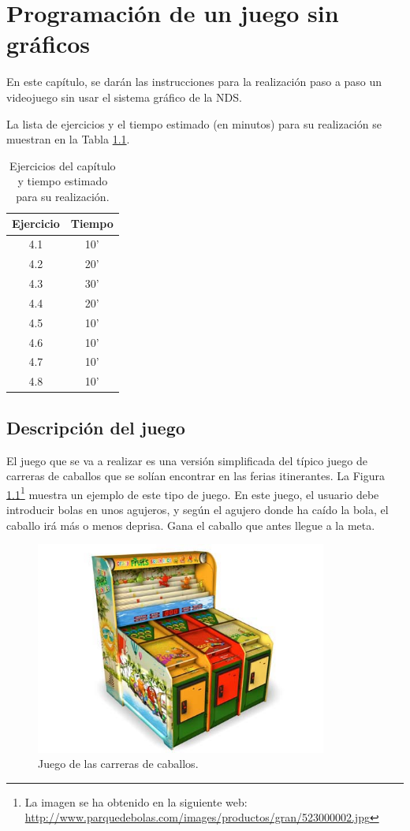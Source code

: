 \chapter{Programación de un juego sin gráficos}

En este capítulo, se darán las instrucciones para la realización paso a paso un videojuego sin usar el sistema gráfico de la NDS.

La lista de ejercicios y el tiempo estimado (en minutos) para su realización se muestran en la Tabla \ref{c4_tab:ejercios}.

\begin{table}[t]
\centering
\caption{Ejercicios del capítulo y tiempo estimado para su realización.}
\begin{tabular}{|c|c|}
\hline 
Ejercicio & Tiempo \\ 
\hline 
 4.1 & 10' \\ 
 4.2 & 20' \\ 
 4.3 & 30' \\ 
 4.4 & 20' \\ 
 4.5 & 10' \\ 
 4.6 & 10' \\ 
 4.7 & 10' \\ 
 4.8 & 10' \\ 
\hline 
\end{tabular} 
\label{c4_tab:ejercios}
\end{table}

\section{Descripción del juego}
El juego que se va a realizar es una versión simplificada del típico juego de carreras de caballos que se solían encontrar en las ferias itinerantes. La Figura \ref{fig_c4_caballos}\footnote{La imagen se ha obtenido en la siguiente web: \url{http://www.parquedebolas.com/images/productos/gran/523000002.jpg}} muestra un ejemplo de este tipo de juego. En este juego, el usuario debe introducir bolas en unos agujeros, y según el agujero donde ha caído la bola, el caballo irá más o menos deprisa. Gana el caballo que antes llegue a la meta.

\begin{figure}[t]
	\centering
	\includegraphics[height=7cm]{Figuras/C4/c4_caballos.jpg}
	\caption{Juego de las carreras de caballos.}
	\label{fig_c4_caballos}
\end{figure}

